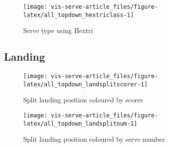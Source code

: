 \documentclass[article]{jss}
\begin{document}
\begin{CodeChunk}
\begin{figure}

{\centering \texttt{[image: vis-serve-article\_files/figure-latex/all\_topdown\_hextriclass-1]} 

}

\caption[Serve type using Hextri]{Serve type using Hextri}\label{fig:all_topdown_hextriclass}
\end{figure}
\end{CodeChunk}

\subsection{Landing}\label{landing}

\begin{CodeChunk}
\begin{figure}

{\centering \texttt{[image: vis-serve-article\_files/figure-latex/all\_topdown\_landsplitscorer-1]} 

}

\caption[Split landing position coloured by scorer]{Split landing position coloured by scorer}\label{fig:all_topdown_landsplitscorer}
\end{figure}
\end{CodeChunk}

\begin{CodeChunk}
\begin{figure}

{\centering \texttt{[image: vis-serve-article\_files/figure-latex/all\_topdown\_landsplitnum-1]} 

}

\caption[Split landing position coloured by serve number]{Split landing position coloured by serve number}\label{fig:all_topdown_landsplitnum}
\end{figure}
\end{CodeChunk}
\end{document}
